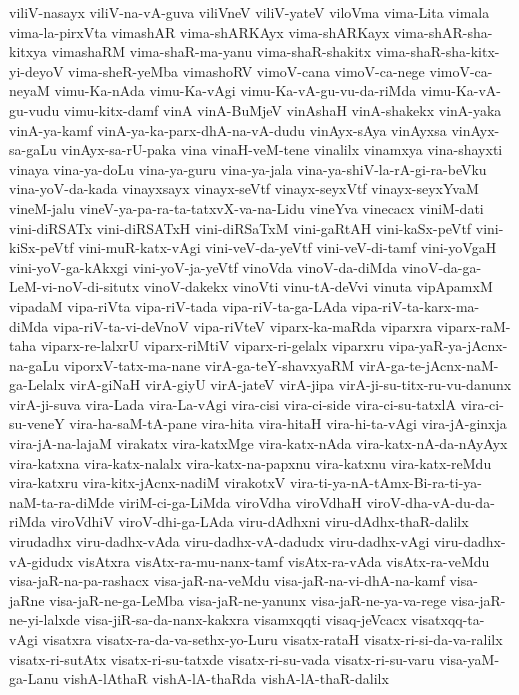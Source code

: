 {viliV-nasayx
viliV-na-vA-guva
viliVneV
viliV-yateV
viloVma
vima-Lita
vimala
vima-la-pirxVta
vimashAR
vima-shARKAyx
vima-shARKayx
vima-shAR-sha-kitxya
vimashaRM
vima-shaR-ma-yanu
vima-shaR-shakitx
vima-shaR-sha-kitx-yi-deyoV
vima-sheR-yeMba
vimashoRV
vimoV-cana
vimoV-ca-nege
vimoV-ca-neyaM
vimu-Ka-nAda
vimu-Ka-vAgi
vimu-Ka-vA-gu-vu-da-riMda
vimu-Ka-vA-gu-vudu
vimu-kitx-damf
vinA
vinA-BuMjeV
vinAshaH
vinA-shakekx
vinA-yaka
vinA-ya-kamf
vinA-ya-ka-parx-dhA-na-vA-dudu
vinAyx-sAya
vinAyxsa
vinAyx-sa-gaLu
vinAyx-sa-rU-paka
vina
vinaH-veM-tene
vinalilx
vinamxya
vina-shayxti
vinaya
vina-ya-doLu
vina-ya-guru
vina-ya-jala
vina-ya-shiV-la-rA-gi-ra-beVku
vina-yoV-da-kada
vinayxsayx
vinayx-seVtf
vinayx-seyxVtf
vinayx-seyxYvaM
vineM-jalu
vineV-ya-pa-ra-ta-tatxvX-va-na-Lidu
vineYva
vinecacx
viniM-dati
vini-diRSATx
vini-diRSATxH
vini-diRSaTxM
vini-gaRtAH
vini-kaSx-peVtf
vini-kiSx-peVtf
vini-muR-katx-vAgi
vini-veV-da-yeVtf
vini-veV-di-tamf
vini-yoVgaH
vini-yoV-ga-kAkxgi
vini-yoV-ja-yeVtf
vinoVda
vinoV-da-diMda
vinoV-da-ga-LeM-vi-noV-di-situtx
vinoV-dakekx
vinoVti
vinu-tA-deVvi
vinuta
vipApamxM
vipadaM
vipa-riVta
vipa-riV-tada
vipa-riV-ta-ga-LAda
vipa-riV-ta-karx-ma-diMda
vipa-riV-ta-vi-deVnoV
vipa-riVteV
viparx-ka-maRda
viparxra
viparx-raM-taha
viparx-re-lalxrU
viparx-riMtiV
viparx-ri-gelalx
viparxru
vipa-yaR-ya-jAcnx-na-gaLu
viporxV-tatx-ma-nane
virA-ga-teY-shavxyaRM
virA-ga-te-jAcnx-naM-ga-Lelalx
virA-giNaH
virA-giyU
virA-jateV
virA-jipa
virA-ji-su-titx-ru-vu-danunx
virA-ji-suva
vira-Lada
vira-La-vAgi
vira-cisi
vira-ci-side
vira-ci-su-tatxlA
vira-ci-su-veneY
vira-ha-saM-tA-pane
vira-hita
vira-hitaH
vira-hi-ta-vAgi
vira-jA-ginxja
vira-jA-na-lajaM
virakatx
vira-katxMge
vira-katx-nAda
vira-katx-nA-da-nAyAyx
vira-katxna
vira-katx-nalalx
vira-katx-na-papxnu
vira-katxnu
vira-katx-reMdu
vira-katxru
vira-kitx-jAcnx-nadiM
virakotxV
vira-ti-ya-nA-tAmx-Bi-ra-ti-ya-naM-ta-ra-diMde
viriM-ci-ga-LiMda
viroVdha
viroVdhaH
viroV-dha-vA-du-da-riMda
viroVdhiV
viroV-dhi-ga-LAda
viru-dAdhxni
viru-dAdhx-thaR-dalilx
virudadhx
viru-dadhx-vAda
viru-dadhx-vA-dadudx
viru-dadhx-vAgi
viru-dadhx-vA-gidudx
visAtxra
visAtx-ra-mu-nanx-tamf
visAtx-ra-vAda
visAtx-ra-veMdu
visa-jaR-na-pa-rashacx
visa-jaR-na-veMdu
visa-jaR-na-vi-dhA-na-kamf
visa-jaRne
visa-jaR-ne-ga-LeMba
visa-jaR-ne-yanunx
visa-jaR-ne-ya-va-rege
visa-jaR-ne-yi-lalxde
visa-jiR-sa-da-nanx-kakxra
visamxqqti
visaq-jeVcacx
visatxqq-ta-vAgi
visatxra
visatx-ra-da-va-sethx-yo-Luru
visatx-rataH
visatx-ri-si-da-va-ralilx
visatx-ri-sutAtx
visatx-ri-su-tatxde
visatx-ri-su-vada
visatx-ri-su-varu
visa-yaM-ga-Lanu
vishA-lAthaR
vishA-lA-thaRda
vishA-lA-thaR-dalilx
}
